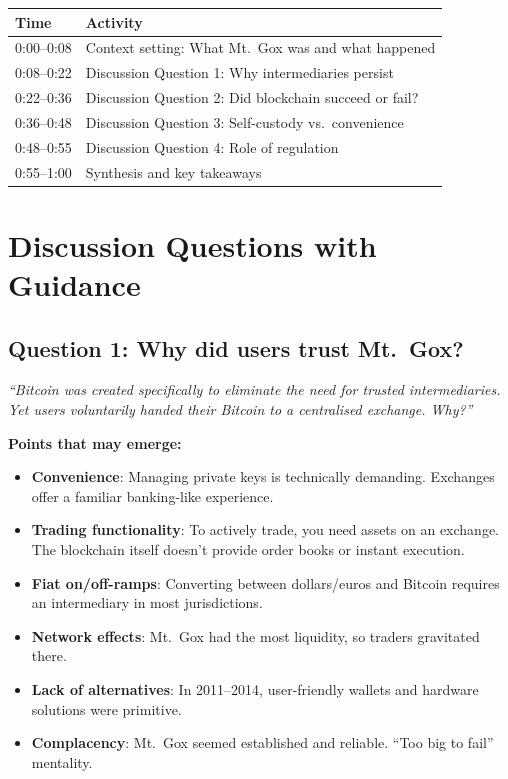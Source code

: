 \documentclass[11pt]{article}
\begin{document}
\begin{center}
\begin{tabular}{ll}
\toprule
\textbf{Time} & \textbf{Activity} \\
\midrule
0:00--0:08 & Context setting: What Mt.\ Gox was and what happened \\
0:08--0:22 & Discussion Question 1: Why intermediaries persist \\
0:22--0:36 & Discussion Question 2: Did blockchain succeed or fail? \\
0:36--0:48 & Discussion Question 3: Self-custody vs.\ convenience \\
0:48--0:55 & Discussion Question 4: Role of regulation \\
0:55--1:00 & Synthesis and key takeaways \\
\bottomrule
\end{tabular}
\end{center}

\section*{Discussion Questions with Guidance}

\subsection*{Question 1: Why did users trust Mt.\ Gox?}

\textit{``Bitcoin was created specifically to eliminate the need for trusted intermediaries. Yet users voluntarily handed their Bitcoin to a centralised exchange. Why?''}

\medskip
\noindent\textbf{Points that may emerge:}

\begin{itemize}[leftmargin=*]
\item \textbf{Convenience}: Managing private keys is technically demanding. Exchanges offer a familiar banking-like experience.
\item \textbf{Trading functionality}: To actively trade, you need assets on an exchange. The blockchain itself doesn't provide order books or instant execution.
\item \textbf{Fiat on/off-ramps}: Converting between dollars/euros and Bitcoin requires an intermediary in most jurisdictions.
\item \textbf{Network effects}: Mt.\ Gox had the most liquidity, so traders gravitated there.
\item \textbf{Lack of alternatives}: In 2011--2014, user-friendly wallets and hardware solutions were primitive.
\item \textbf{Complacency}: Mt.\ Gox seemed established and reliable. ``Too big to fail'' mentality.
\end{itemize}
\end{document}
